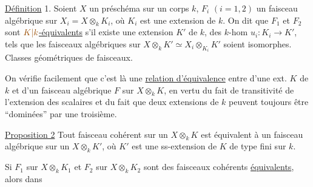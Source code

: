 \uline{Définition} 1. Soient $X$ un préschéma  sur un corps $k$, $F_i$  $(i=1,2)$ un faisceau algébrique sur $X_i=X\otimes_kK_i$, où $K_i$ est une extension de $k$. On dit que $F_1$ et $F_2$ sont \uline{$\unsure{K|k}$-équivalents} s'il existe une extension $K'$ de $k$, des $k$-hom $u_i:K_i\longrightarrow K'$, tels que  les faisceaux algébriques  sur $X\otimes_kK'\simeq X_i\otimes_{K_i}K'$ soient isomorphes.  Classes géométriques de faisceaux.

On vérifie facilement que c'est là une \uline{relation d'équivalence} entre  d'une ext. $K$ de $k$ et d'un faisceau algébrique $F$ sur $X\otimes_kK$, en vertu du fait de transitivité de l'extension des scalaires et du fait que deux extensions de $k$ peuvent toujours être ``dominées'' par une troisième.

\uline{Proposition 2}  Tout faisceau cohérent sur un $X\otimes_kK$ est équivalent à un faisceau algébrique sur un $X\otimes_kK'$, où $K'$ est une ss-extension de $K$ de type fini sur $k$.

Si $F_1$ sur $X\otimes_kK_1$ et $F_2$ sur $X\otimes_kK_2$ sont des faisceaux cohérents \uline{équivalents},   alors dans
